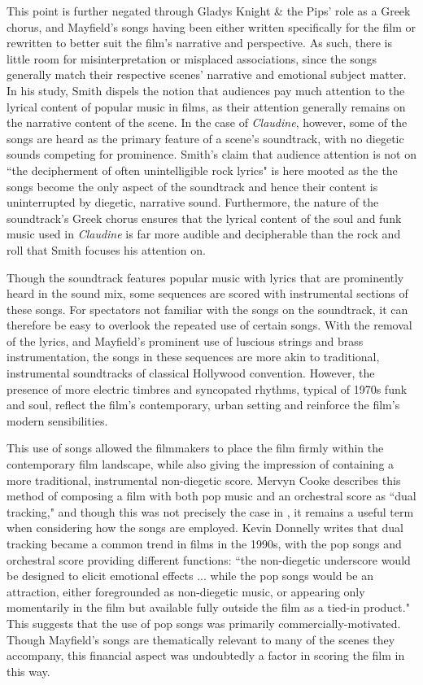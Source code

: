 This point is further negated through Gladys Knight \& the Pips' role as a Greek chorus, and Mayfield's songs having been either written specifically for the film or rewritten to better suit the film's narrative and perspective.
As such, there is little room for misinterpretation or misplaced associations, since the songs generally match their respective scenes' narrative and emotional subject matter.
In his study, Smith dispels the notion that audiences pay much attention to the lyrical content of popular music in films, as their attention generally remains on the narrative content of the scene.
In the case of \textit{Claudine}, however, some of the songs are heard as the primary feature of a scene's soundtrack, with no diegetic sounds competing for prominence.
Smith's claim that audience attention is not on ``the decipherment of often unintelligible rock lyrics" is here mooted as the the songs become the only aspect of the soundtrack and hence their content is uninterrupted by diegetic, narrative sound.\autocite[][166]{smith_sounds_1998}
Furthermore, the nature of the soundtrack's Greek chorus ensures that the lyrical content of the soul and funk music used in \textit{Claudine} is far more audible and decipherable than the rock and roll that Smith focuses his attention on.

Though the soundtrack features popular music with lyrics that are prominently heard in the sound mix, some sequences are scored with instrumental sections of these songs.
For spectators not familiar with the songs on the soundtrack, it can therefore be easy to overlook the repeated use of certain songs.
With the removal of the lyrics, and Mayfield's prominent use of luscious strings and brass instrumentation, the songs in these sequences are more akin to traditional, instrumental soundtracks of classical Hollywood convention.
However, the presence of more electric timbres and syncopated rhythms, typical of 1970s funk and soul, reflect the film's contemporary, urban setting and reinforce the film's modern sensibilities.

This use of songs allowed the filmmakers to place the film firmly within the contemporary film landscape, while also giving the impression of containing a more traditional, instrumental non-diegetic score.
Mervyn Cooke describes this method of composing a film with both pop music and an orchestral score as ``dual tracking," and though this was not precisely the case in \textcite{berry_claudine_1974}, it remains a useful term when considering how the songs are employed.\autocite[][477]{cooke_history_2008}
Kevin Donnelly writes that dual tracking became a common trend in films in the 1990s, with the pop songs and orchestral score providing different functions: ``the non-diegetic underscore would be designed to elicit emotional effects ... while the pop songs would be an attraction, either foregrounded as non-diegetic music, or appearing only momentarily in the film but available fully outside the film as a tied-in product."\autocite[][153-154]{donnelly_pop_2001}
This suggests that the use of pop songs was primarily commercially-motivated.
Though Mayfield's songs are thematically relevant to many of the scenes they accompany, this financial aspect was undoubtedly a factor in scoring the film in this way.

